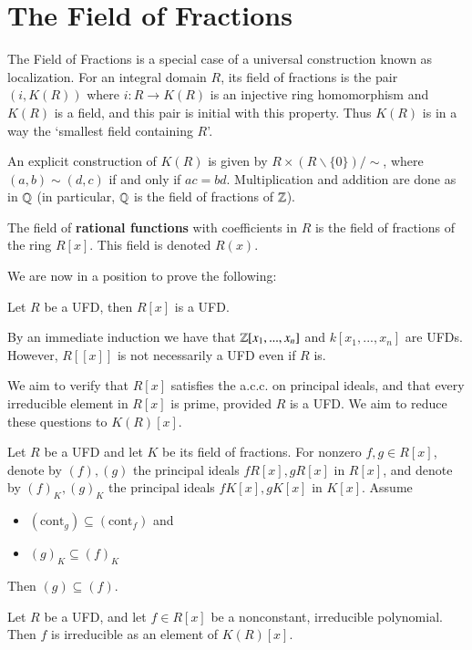 \documentclass[12pt, a4paper, oneside, openright, titlepage]{book}
\begin{document}
\section{The Field of Fractions}

The Field of Fractions is a special case of a universal construction known as localization. For an integral domain $R$, its field of fractions is the pair $(i,K(R))$ where $i:R\rightarrow K(R)$ is an injective ring homomorphism and $K(R)$ is a field, and this pair is initial with this property. Thus $K(R)$ is in a way the `smallest field containing $R$'.


An explicit construction of $K(R)$ is given by $R\times (R\backslash\{0\})/\sim$, where $(a,b)\sim (d,c)$ if and only if $ac = bd$. Multiplication and addition are done as in $\mathbb Q$ (in particular, $\mathbb Q$ is the field of fractions of $\mathbb Z$).

\begin{defn}
    The field of \textbf{rational functions} with coefficients in $R$ is the field of fractions of the ring $R[x]$. This field is denoted $R(x)$.
\end{defn}

We are now in a position to prove the following:
\begin{thm}
    Let $R$ be a UFD, then $R[x]$ is a UFD.
\end{thm}

By an immediate induction we have that $\mathbb Z[x_1,...,x_n]$ and $k[x_1,...,x_n]$ are UFDs. However, $R[[x]]$ is not necessarily a UFD even if $R$ is.

We aim to verify that $R[x]$ satisfies the a.c.c. on principal ideals, and that every irreducible element in $R[x]$ is prime, provided $R$ is a UFD. We aim to reduce these questions to $K(R)[x]$.

\begin{lem}
    Let $R$ be a UFD and let $K$ be its field of fractions. For nonzero $f,g \in R[x]$, denote by $(f), (g)$ the principal ideals $fR[x],gR[x]$ in $R[x]$, and denote by $(f)_K,(g)_K$ the principal ideals $fK[x],gK[x]$ in $K[x]$. Assume \begin{itemize}
        \item $(\text{cont}_g) \subseteq (\text{cont}_f)$ and 
        \item $(g)_K \subseteq (f)_K$
    \end{itemize}
    Then $(g) \subseteq (f)$.
\end{lem}

\begin{prop}
    Let $R$ be a UFD, and let $f \in R[x]$ be a nonconstant, irreducible polynomial. Then $f$ is irreducible as an element of $K(R)[x]$.
\end{prop}
\end{document}

